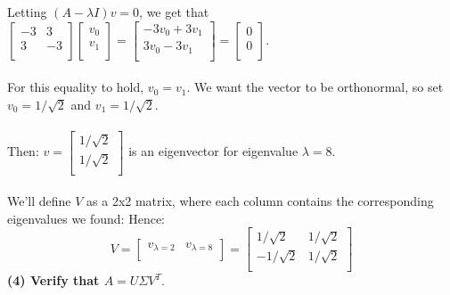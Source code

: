 \documentclass[11pt]{article}
\begin{document}
Letting $(A - \lambda I)v = 0$, we get that $ \begin{bmatrix}
-3 & 3 \\
3 & -3 \\
\end{bmatrix} \begin{bmatrix}
v_0 \\
v_1 \\
\end{bmatrix} = \begin{bmatrix}
-3v_0 + 3v_1 \\
3v_0 -3v_1 \\
\end{bmatrix} = \begin{bmatrix}
0 \\
0 \\
\end{bmatrix} $. \\\\
For this equality to hold, $v_0 = v_1$. We want the vector to be orthonormal, so set $v_0 = 1 / \sqrt2$ and $v_1 = 1 / \sqrt2.$ \\\\
Then: $v = \begin{bmatrix}
1 / \sqrt2 \\
1 / \sqrt2 \\
\end{bmatrix}$ is an eigenvector for eigenvalue $\lambda = 8$. \\\\
We'll define $V$ as a 2x2 matrix, where each column contains the corresponding eigenvalues we found:
Hence:
$$ \boxed{ V = \begin{bmatrix} 
v_{\lambda = 2} & v_{\lambda = 8} \\
\end{bmatrix} = \begin{bmatrix}
1 / \sqrt2 & 1 / \sqrt2 \\
-1 / \sqrt2 & 1 / \sqrt2 \\
\end{bmatrix}}$$
\textbf{(4) Verify that $A = U \Sigma V^T.$}
\end{document}
